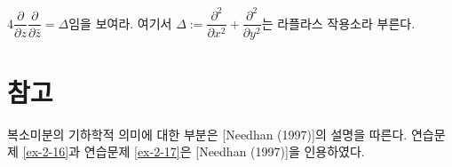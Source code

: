 \begin{salt_exercise} \label{ex-2-19}
$4\dfrac{\partial}{\partial z}\dfrac{\partial}{\partial \bar z} = \Delta$임을 보여라.
여기서 $\Delta := \dfrac{\partial^2}{\partial x^2} + \dfrac{\partial^2}{\partial y^2}$는
라플라스 작용소라 부른다.
\end{salt_exercise}

\section{참고}

복소미분의 기하학적 의미에 대한 부분은  [Needhan (1997)]의 설명을 따른다.
연습문제 \ref{ex-2-16}과  연습문제 \ref{ex-2-17}은 [Needhan (1997)]을 인용하였다.




